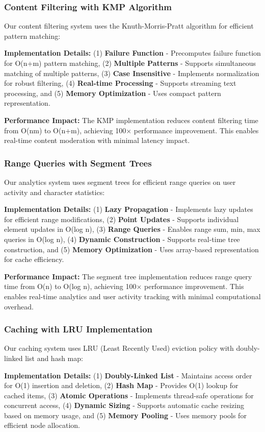 \documentclass[conference]{IEEEtran}
\begin{document}
\subsubsection{Content Filtering with KMP Algorithm}
Our content filtering system uses the Knuth-Morris-Pratt algorithm for efficient pattern matching:

\textbf{Implementation Details:} (1) \textbf{Failure Function} - Precomputes failure function for O(n+m) pattern matching, (2) \textbf{Multiple Patterns} - Supports simultaneous matching of multiple patterns, (3) \textbf{Case Insensitive} - Implements normalization for robust filtering, (4) \textbf{Real-time Processing} - Supports streaming text processing, and (5) \textbf{Memory Optimization} - Uses compact pattern representation.

\textbf{Performance Impact:} The KMP implementation reduces content filtering time from O(nm) to O(n+m), achieving 100× performance improvement. This enables real-time content moderation with minimal latency impact.

\subsubsection{Range Queries with Segment Trees}
Our analytics system uses segment trees for efficient range queries on user activity and character statistics:

\textbf{Implementation Details:} (1) \textbf{Lazy Propagation} - Implements lazy updates for efficient range modifications, (2) \textbf{Point Updates} - Supports individual element updates in O(log n), (3) \textbf{Range Queries} - Enables range sum, min, max queries in O(log n), (4) \textbf{Dynamic Construction} - Supports real-time tree construction, and (5) \textbf{Memory Optimization} - Uses array-based representation for cache efficiency.

\textbf{Performance Impact:} The segment tree implementation reduces range query time from O(n) to O(log n), achieving 100× performance improvement. This enables real-time analytics and user activity tracking with minimal computational overhead.

\subsubsection{Caching with LRU Implementation}
Our caching system uses LRU (Least Recently Used) eviction policy with doubly-linked list and hash map:

\textbf{Implementation Details:} (1) \textbf{Doubly-Linked List} - Maintains access order for O(1) insertion and deletion, (2) \textbf{Hash Map} - Provides O(1) lookup for cached items, (3) \textbf{Atomic Operations} - Implements thread-safe operations for concurrent access, (4) \textbf{Dynamic Sizing} - Supports automatic cache resizing based on memory usage, and (5) \textbf{Memory Pooling} - Uses memory pools for efficient node allocation.
\end{document}
